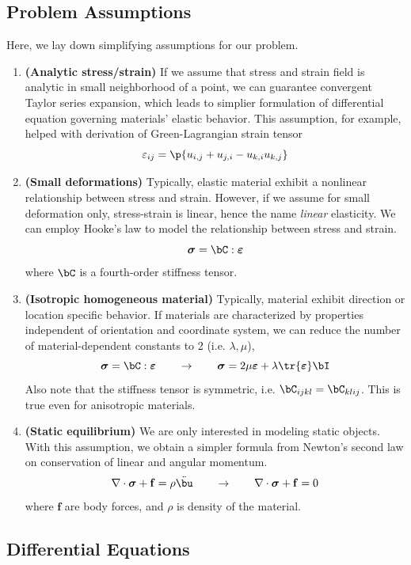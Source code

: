 \documentclass[11pt,titlepage]{article}
\newcommand{\bheading}[1]{\textbf{(#1)}}
\newcommand{\bsigma}{\boldsymbol{\sigma}}
\newcommand{\bepsilon}{\boldsymbol{\varepsilon}}
\renewcommand{\epsilon}{\varepsilon}
\renewcommand{\bf}{\mathbf{f}}
\begin{document}
\subsection{Problem Assumptions}

Here, we lay down simplifying assumptions for our problem.
\begin{enumerate}
    \item \bheading{Analytic stress/strain} If we assume that stress and strain field is analytic in small neighborhood of a point, we can guarantee convergent Taylor series expansion, which leads to simplier formulation of differential equation governing materials' elastic behavior. This assumption, for example, helped with derivation of Green-Lagrangian strain tensor
    \[
        \epsilon_{ij} = \p{u_{i,j} + u_{j,i} - u_{k,i}u_{k,j}}    
    \]
    \item \bheading{Small deformations} Typically, elastic material exhibit a nonlinear relationship between stress and strain. However, if we assume for small deformation only, stress-strain is linear, hence the name \textit{linear} elasticity. We can employ Hooke's law to model the relationship between stress and strain.
    \[
        \bsigma = \bC : \bepsilon
    \]
    where $\bC$ is a fourth-order stiffness tensor.
    \item \bheading{Isotropic homogeneous material} Typically, material exhibit direction or location specific behavior. If materials are characterized by properties independent of orientation and coordinate system, we can reduce the number of material-dependent constants to 2 (i.e. $\lambda,\mu$),
    \[
        \bsigma = \bC : \bepsilon
        \quad \quad \rightarrow \quad \quad
        \bsigma = 2\mu\bepsilon + \lambda \tr{\bepsilon} \bI
    \]
    Also note that the stiffness tensor is symmetric, i.e. $\bC_{ijkl} = \bC_{klij}$. This is true even for anisotropic materials.
    \item \bheading{Static equilibrium} We are only interested in modeling static objects. With this assumption, we obtain a simpler formula from Newton's second law on conservation of linear and angular momentum.
    \[
        \nabla\cdot\bsigma + \bf = \rho \ddot{\bu}
        \quad \quad \rightarrow \quad \quad
        \nabla\cdot\bsigma + \bf = 0
    \]
    where $\bf$ are body forces, and $\rho$ is density of the material.
\end{enumerate}


\subsection{Differential Equations}
\end{document}

